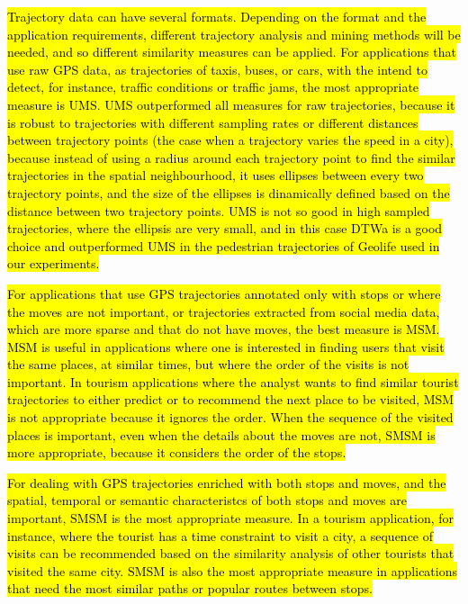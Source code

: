 \documentclass[12pt]{article}
\begin{document}
\hl{Trajectory data can have several formats. Depending on the format and the application requirements, different trajectory analysis and mining methods will be needed, and so different similarity measures can be applied. For applications that use raw GPS data, as trajectories of taxis, buses, or cars, with the intend to detect, for instance, traffic conditions or traffic jams, the most appropriate measure is UMS. UMS outperformed all measures for raw trajectories, because it is robust to trajectories with different sampling rates or different distances between trajectory points (the case when a trajectory varies the speed in a city), because instead of using a radius around each trajectory point to find the similar trajectories in the spatial neighbourhood, it uses ellipses between every two trajectory points, and the size of the ellipses is dinamically defined based on the distance between two trajectory points. UMS is not so good in high sampled trajectories, where the ellipsis are very small, and in this case DTWa is  a good choice and outperformed UMS in the pedestrian trajectories of Geolife used in our experiments.}

\hl{For applications that use GPS trajectories annotated only with stops or where the moves are not important, or trajectories extracted from social media data, which are more sparse and that do not have moves, the best measure is MSM. MSM is useful in applications where one is interested in finding users that visit the same places, at similar times, but where the order of the visits is not important. In tourism applications where the analyst wants to find similar tourist trajectories to either predict or to recommend the next place to be visited, MSM is not appropriate because it ignores the order. When the sequence of the visited places is important, even when the details about the moves are not, SMSM is more appropriate, because it considers the order of the stops.}

\hl{For dealing with GPS trajectories enriched with both stops and moves, and the spatial, temporal or semantic characteristcs of both stops and moves are important, SMSM is the most appropriate measure. In a tourism application, for instance, where the tourist has a time constraint to visit a city, a sequence of visits can be recommended based on the similarity analysis of other tourists that visited the same city. SMSM is also the most appropriate measure in applications that need the most similar paths or popular routes between stops.}
\end{document}
